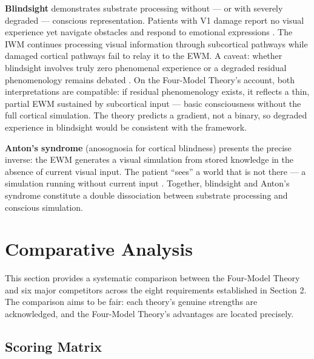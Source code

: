 \documentclass[12pt]{article}
\begin{document}
\textbf{Blindsight} demonstrates substrate processing without --- or with severely degraded --- conscious representation. Patients with V1 damage report no visual experience yet navigate obstacles and respond to emotional expressions \citep{Weiskrantz1986}. The IWM continues processing visual information through subcortical pathways while damaged cortical pathways fail to relay it to the EWM. A caveat: whether blindsight involves truly zero phenomenal experience or a degraded residual phenomenology remains debated \citep{Phillips2021}. On the Four-Model Theory's account, both interpretations are compatible: if residual phenomenology exists, it reflects a thin, partial EWM sustained by subcortical input --- basic consciousness without the full cortical simulation. The theory predicts a gradient, not a binary, so degraded experience in blindsight would be consistent with the framework.

\textbf{Anton's syndrome} (anosognosia for cortical blindness) presents the precise inverse: the EWM generates a visual simulation from stored knowledge in the absence of current visual input. The patient ``sees'' a world that is not there --- a simulation running without current input \citep{Anton1899,Aldrich1987}. Together, blindsight and Anton's syndrome constitute a double dissociation between substrate processing and conscious simulation.



\section{Comparative Analysis}


This section provides a systematic comparison between the Four-Model Theory and six major competitors across the eight requirements established in Section 2. The comparison aims to be fair: each theory's genuine strengths are acknowledged, and the Four-Model Theory's advantages are located precisely.


\subsection{Scoring Matrix}
\end{document}
